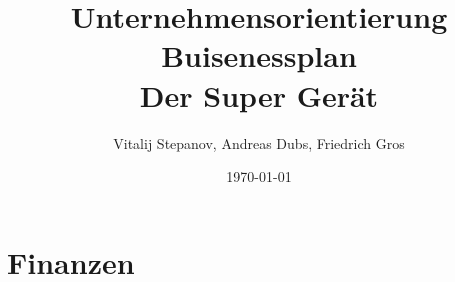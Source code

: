 \documentclass[12pt,a4paper]{scrartcl}
\begin{document}
\title{Unternehmensorientierung\\
	  Buisenessplan\\
	  Der Super Gerät}
\author{Vitalij Stepanov, Andreas Dubs, Friedrich Gros}
\date{\today}
\maketitle

\newpage
\pagestyle{myheadings}
 








\section{Finanzen}
%
\end{document}

